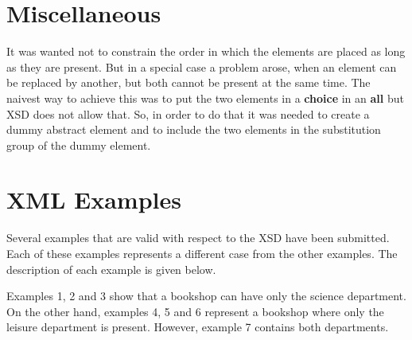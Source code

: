 \documentclass{article}
\begin{document}
\section{Miscellaneous}

It was wanted not to constrain the order in which the elements are placed as long as they are present. But in a special case a problem arose, when an element can be replaced by another, but both cannot be present at the same time. The naivest way to achieve this was to put the two elements in a \textbf{choice} in an \textbf{all} but XSD does not allow that. So, in order to do that it was needed to create a dummy abstract element and to include the two elements in the substitution group of the dummy element.


\section{XML Examples}

Several examples that are valid with respect to the XSD have been submitted. Each of these examples represents a different case from the other examples. The description of each example is given below.

Examples 1, 2 and 3 show that a bookshop can have only the science department. On the other hand, examples 4, 5 and 6 represent a bookshop where only the leisure department is present. However, example 7 contains both departments.
\end{document}

